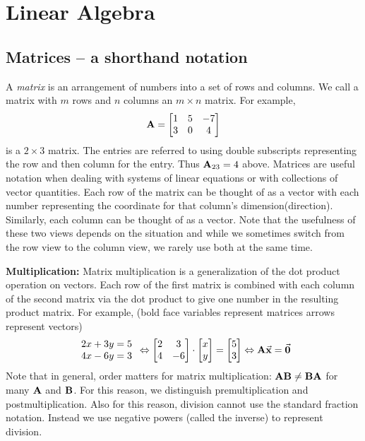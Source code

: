 %
\chapter{Linear Algebra}
%
\section{Matrices -- a shorthand notation}
A \emph{matrix} is an arrangement of numbers into
a set of rows and columns.  We call a matrix with
$m$ rows and $n$ columns an $m\times n$ matrix.
For example,
\[
   {\textbf{A}} = \begin{bmatrix}
           1 & 5 & -7 \\ 3 & 0 & 4
       \end{bmatrix}
\]
is a $2\times 3$ matrix.  The entries are referred to using double
subscripts representing the row and then column for the entry.  Thus
${\textbf{A}}_{23}=4$ above.
%
Matrices are useful notation when dealing with systems of linear
equations or with collections of vector quantities.  Each row of
the matrix can be thought of as a vector with each number representing
the coordinate for that column's dimension(direction).
Similarly, each column can be thought of as a vector.  Note that
the usefulness of these two views depends on the situation and while
we sometimes switch from the row view to the column view, we rarely
use both at the same time.

{\bf Multiplication:} Matrix multiplication is a generalization of the dot product operation 
on vectors.  Each row of the first matrix is combined with each column
of the second matrix via the dot product to give one number in the resulting
product matrix.
For example, (bold face variables represent matrices arrows represent vectors)
\[
   \begin{array}{c}
     2x+3y=5 \\ 4x-6y=3
   \end{array}
   \Leftrightarrow
   \begin{bmatrix}
      2 & 3 \\ 4 & -6
   \end{bmatrix}
   \cdot
   \begin{bmatrix}
      x \\ y
   \end{bmatrix}
    =
   \begin{bmatrix}
      5 \\ 3
   \end{bmatrix}
   \Leftrightarrow
   {\textbf{A}}\vec{\textbf{x}} = \vec{\textbf{0}}
\]
Note that in general, order matters for matrix multiplication:  
${\textbf{A}}{\textbf{B}} \neq {\textbf{B}}{\textbf{A}}$ for many ${\textbf{A}}$ and ${\textbf{B}}$.
For this reason, we distinguish premultiplication and postmultiplication.
Also for this reason, division cannot use the standard fraction notation.
Instead we use negative powers (called the inverse) to represent division.

